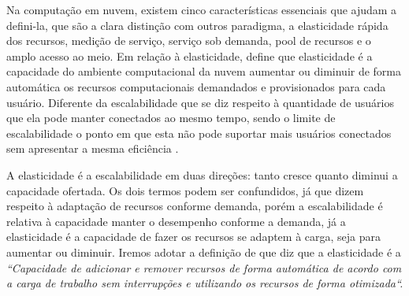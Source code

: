 \documentclass[twoside,english,brazilian]{UNISINOSartigo}
\begin{document}
Na computação em nuvem, existem cinco características essenciais que ajudam a defini-la, que são a clara distinção com outros paradigma, a elasticidade rápida dos recursos, medição de serviço, serviço sob demanda, pool de recursos e o amplo acesso ao meio\cite{Moreira2010}. Em relação à elasticidade,  define que elasticidade é a capacidade do ambiente computacional da nuvem aumentar ou diminuir de forma automática os recursos computacionais demandados e provisionados para cada usuário. Diferente da escalabilidade que se diz respeito à quantidade de usuários que ela pode manter conectados ao mesmo tempo, sendo o limite de escalabilidade o ponto em que esta não pode suportar mais usuários conectados sem apresentar a mesma  eficiência \cite{Wilder12}. 

A elasticidade é a escalabilidade em duas direções: tanto cresce quanto diminui a capacidade ofertada. Os dois termos podem ser confundidos, já que dizem respeito à adaptação de recursos conforme demanda, porém a escalabilidade é relativa à capacidade manter o desempenho conforme a demanda, já a elasticidade é a capacidade de fazer os recursos se adaptem à carga, seja para aumentar ou diminuir. 
Iremos adotar a definição de  que diz que a elasticidade é a \textit{``Capacidade de adicionar e remover recursos de forma automática de acordo com a carga de trabalho sem interrupções e utilizando os recursos de forma otimizada``.}
\end{document}
